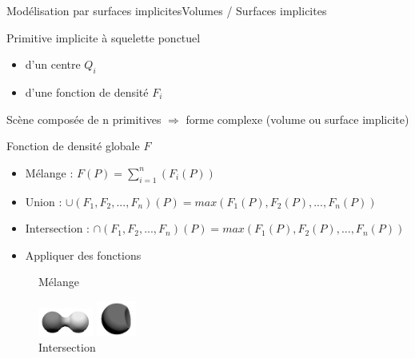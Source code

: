 \documentclass{beamer}
\begin{document}
\begin{frame}[c]{Modélisation par surfaces implicites}{Volumes / Surfaces implicites}
\begin{block}{Primitive implicite à squelette ponctuel}
 \begin{itemize}
 \item d’un centre $Q_i $
 \item d’une fonction de densité $F_i$
 \end{itemize}
 	 
\end{block}
Scène composée de n primitives 
\newline $\Rightarrow$ forme complexe (volume ou surface implicite)
\begin{block}{Fonction de densité globale $F$}
\begin{itemize}
\item Mélange : $F(P) = \sum_{i=1}^{n} (F_i(P))$
\item Union : $\cup (F_1, F_2, ..., F_n)(P) = max(F_1(P), F_2(P), ..., F_n(P))$
\item Intersection : $\cap (F_1, F_2, ..., F_n)(P) = max(F_1(P), F_2(P), ..., F_n(P))$
\item Appliquer des fonctions
\end{itemize}
\end{block}

\begin{center}
\begin{figure}
\parbox{2cm}{\caption{Mélange}}
\parbox{1.8cm}{\includegraphics[width=1.8cm]{surfaceImplicite/melange.png}}
\hfill
\parbox{2cm}{\caption{Intersection}}
\parbox{1.3cm}{\includegraphics[width=1.3cm]{surfaceImplicite/intersection.png}}
\end{figure}

\end{center}
\end{frame}
\end{document}
